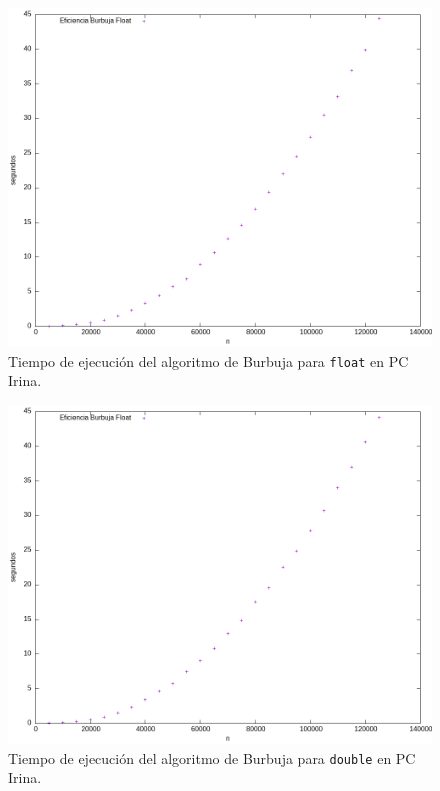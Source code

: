 \documentclass[12pt]{article}
\begin{document}
    \begin{figure}
        \centering
        \includegraphics[width=0.8\linewidth]{images/Burbuja/graficos/float.png}
        \cprotect\caption{Tiempo de ejecución del algoritmo de Burbuja para \verb|float| en PC Irina.}
        \label{fig:Burbuja_float_graf}
    \end{figure}    
    \begin{figure}
        \centering
        \includegraphics[width=0.8\linewidth]{images/Burbuja/graficos/double.png}
        \cprotect\caption{Tiempo de ejecución del algoritmo de Burbuja para \verb|double| en PC Irina.}
        \label{fig:Burbuja_double_graf}
    \end{figure}    
\end{document}
